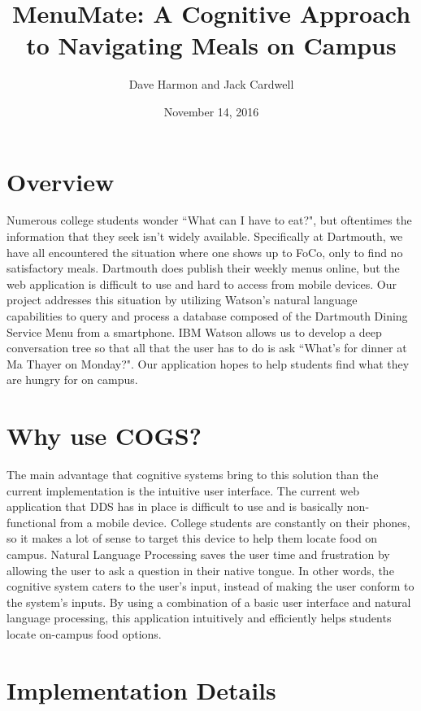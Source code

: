 \documentclass [12pt] {article}
\begin{document}
\title{\textbf{MenuMate: A Cognitive Approach to Navigating Meals on Campus}}
\author{Dave Harmon and Jack Cardwell}
\date{November 14, 2016}
\maketitle

\pagebreak

\section{Overview}

Numerous college students wonder ``What can I have to eat?", but oftentimes the information that they seek isn't widely available. Specifically at Dartmouth, we have all encountered the situation where one shows up to FoCo, only to find no satisfactory meals. Dartmouth does publish their weekly menus online, but the web application is difficult to use and hard to access from mobile devices. Our project addresses this situation by utilizing Watson's natural language capabilities to query and process a database composed of the Dartmouth Dining Service Menu from a smartphone. IBM Watson allows us to develop a deep conversation tree so that all that the user has to do is ask ``What's for dinner at Ma Thayer on Monday?". Our application hopes to help students find what they are hungry for on campus.

\section{Why use COGS?}

The main advantage that cognitive systems bring to this solution than the current implementation is the intuitive user interface. The current web application that DDS has in place is difficult to use and is basically non-functional from a mobile device. College students are constantly on their phones, so it makes a lot of sense to target this device to help them locate food on campus. Natural Language Processing saves the user time and frustration by allowing the user to ask a question in their native tongue. In other words, the cognitive system caters to the user's input, instead of making the user conform to the system's inputs. By using a combination of a basic user interface and natural language processing, this application intuitively and efficiently helps students locate on-campus food options.

\section{Implementation Details}
\end{document}
